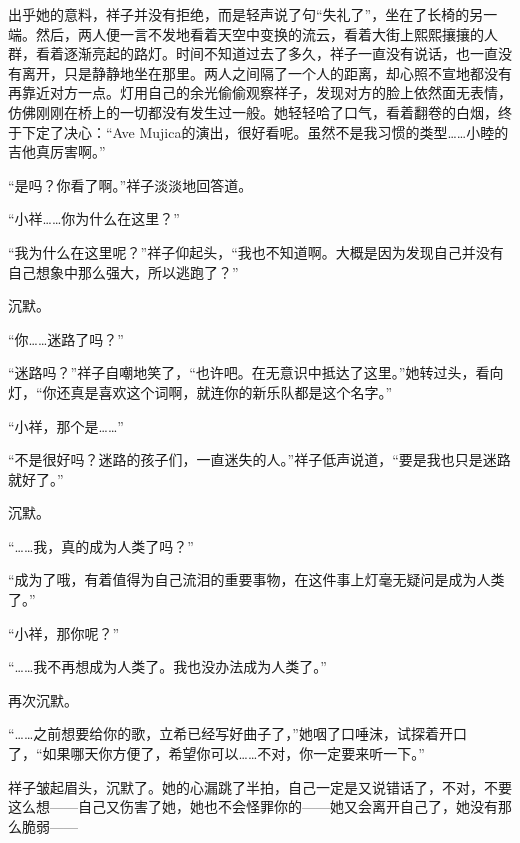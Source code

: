 \documentclass{article}
\begin{document}
出乎她的意料，祥子并没有拒绝，而是轻声说了句“失礼了”，坐在了长椅的另一端。然后，两人便一言不发地看着天空中变换的流云，看着大街上熙熙攘攘的人群，看着逐渐亮起的路灯。时间不知道过去了多久，祥子一直没有说话，也一直没有离开，只是静静地坐在那里。两人之间隔了一个人的距离，却心照不宣地都没有再靠近对方一点。灯用自己的余光偷偷观察祥子，发现对方的脸上依然面无表情，仿佛刚刚在桥上的一切都没有发生过一般。她轻轻哈了口气，看着翻卷的白烟，终于下定了决心：“Ave Mujica的演出，很好看呢。虽然不是我习惯的类型……小睦的吉他真厉害啊。”



“是吗？你看了啊。”祥子淡淡地回答道。



“小祥……你为什么在这里？”



“我为什么在这里呢？”祥子仰起头，“我也不知道啊。大概是因为发现自己并没有自己想象中那么强大，所以逃跑了？”



沉默。



“你……迷路了吗？”



“迷路吗？”祥子自嘲地笑了，“也许吧。在无意识中抵达了这里。”她转过头，看向灯，“你还真是喜欢这个词啊，就连你的新乐队都是这个名字。”



“小祥，那个是……”



“不是很好吗？迷路的孩子们，一直迷失的人。”祥子低声说道，“要是我也只是迷路就好了。”



沉默。



“……我，真的成为人类了吗？”



“成为了哦，有着值得为自己流泪的重要事物，在这件事上灯毫无疑问是成为人类了。”



“小祥，那你呢？”



“……我不再想成为人类了。我也没办法成为人类了。”



再次沉默。



“……之前想要给你的歌，立希已经写好曲子了，”她咽了口唾沫，试探着开口了，“如果哪天你方便了，希望你可以……不对，你一定要来听一下。”



祥子皱起眉头，沉默了。她的心漏跳了半拍，自己一定是又说错话了，不对，不要这么想——自己又伤害了她，她也不会怪罪你的——她又会离开自己了，她没有那么脆弱——
\end{document}
